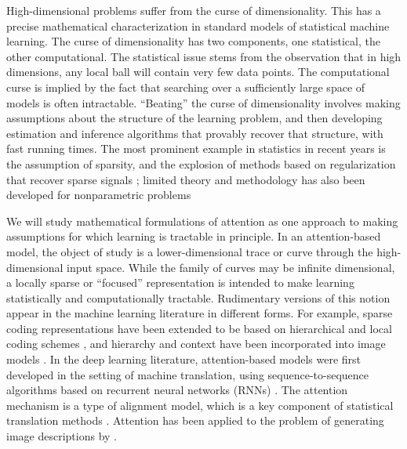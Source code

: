 \statbackground{} High-dimensional problems suffer from the curse of
dimensionality. This has a precise mathematical characterization in
standard models of statistical machine learning. The curse of
dimensionality has two components, one statistical, the other
computational. The statistical issue stems from the observation that
in high dimensions, any local ball will contain very few data
points. The computational curse is implied by the fact that searching
over a sufficiently large space of models is often
intractable. ``Beating'' the curse of dimensionality involves making
assumptions about the structure of the learning problem, and then
developing estimation and inference algorithms that provably 
recover that structure, with fast running times. The most prominent 
example in statistics in recent years is the assumption of sparsity, and the explosion of methods based on regularization that recover sparse signals \citep{Tibs:1996,lars,Wain:09a,wasserman:09,Zou:Hastie:Tibs:05,FHT:07}; limited theory and methodology has also been developed for nonparametric problems \citep{LZ:Cosso,Ravikumar:08,lafferty2008rodeo,NPN:09,skeptic,NRRR:NIPS}

We will study mathematical formulations of attention as one approach
to making assumptions for which learning is tractable in principle.
In an attention-based model, the object of study is a
lower-dimensional trace or curve through the high-dimensional input
space. While the family of curves may be infinite dimensional, a
locally sparse or ``focused'' representation is intended to make
learning statistically and computationally tractable. Rudimentary
versions of this notion appear in the machine learning literature in
different forms.  For example, sparse coding representations have
been extended to be based on hierarchical and local coding schemes
\citep{WangYYLHG10,YuLL11}, and hierarchy and context have been 
incorporated into image models \citep{ChangJZBG11,JinG06}. In the
deep learning literature, attention-based models were first developed
in the setting of machine translation, using sequence-to-sequence
algorithms based on recurrent neural networks
(RNNs) \citep{bahdanau2014}. The attention mechanism is a type of
alignment model, which is a key component of statistical translation
methods \citep{Brown1993}. Attention has been applied to the problem of generating image
descriptions by \cite{showtell}.

